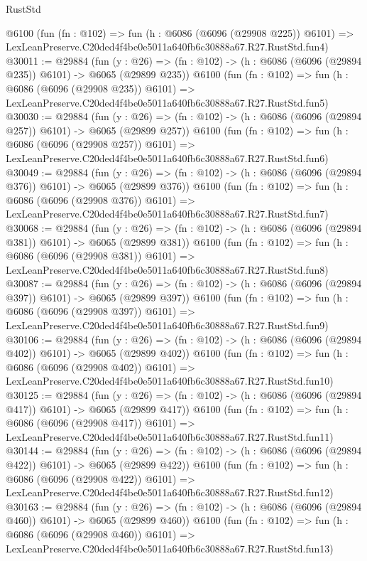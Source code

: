 \begin{lexlean}{RustStd}
\begin{coremodule}
    @6100
    (fun (fn : @102) =>
    fun (h : @6086 (@6096 (@29908 @225)) @6101) =>
    LexLeanPreserve.C20ded4f4be0e5011a640fb6c30888a67.R27.RustStd.fun4)
@30011 := @29884
    (fun (y : @26) => (fn : @102) -> (h : @6086 (@6096 (@29894 @235)) @6101) -> @6065 (@29899 @235))
    @6100
    (fun (fn : @102) =>
    fun (h : @6086 (@6096 (@29908 @235)) @6101) =>
    LexLeanPreserve.C20ded4f4be0e5011a640fb6c30888a67.R27.RustStd.fun5)
@30030 := @29884
    (fun (y : @26) => (fn : @102) -> (h : @6086 (@6096 (@29894 @257)) @6101) -> @6065 (@29899 @257))
    @6100
    (fun (fn : @102) =>
    fun (h : @6086 (@6096 (@29908 @257)) @6101) =>
    LexLeanPreserve.C20ded4f4be0e5011a640fb6c30888a67.R27.RustStd.fun6)
@30049 := @29884
    (fun (y : @26) => (fn : @102) -> (h : @6086 (@6096 (@29894 @376)) @6101) -> @6065 (@29899 @376))
    @6100
    (fun (fn : @102) =>
    fun (h : @6086 (@6096 (@29908 @376)) @6101) =>
    LexLeanPreserve.C20ded4f4be0e5011a640fb6c30888a67.R27.RustStd.fun7)
@30068 := @29884
    (fun (y : @26) => (fn : @102) -> (h : @6086 (@6096 (@29894 @381)) @6101) -> @6065 (@29899 @381))
    @6100
    (fun (fn : @102) =>
    fun (h : @6086 (@6096 (@29908 @381)) @6101) =>
    LexLeanPreserve.C20ded4f4be0e5011a640fb6c30888a67.R27.RustStd.fun8)
@30087 := @29884
    (fun (y : @26) => (fn : @102) -> (h : @6086 (@6096 (@29894 @397)) @6101) -> @6065 (@29899 @397))
    @6100
    (fun (fn : @102) =>
    fun (h : @6086 (@6096 (@29908 @397)) @6101) =>
    LexLeanPreserve.C20ded4f4be0e5011a640fb6c30888a67.R27.RustStd.fun9)
@30106 := @29884
    (fun (y : @26) => (fn : @102) -> (h : @6086 (@6096 (@29894 @402)) @6101) -> @6065 (@29899 @402))
    @6100
    (fun (fn : @102) =>
    fun (h : @6086 (@6096 (@29908 @402)) @6101) =>
    LexLeanPreserve.C20ded4f4be0e5011a640fb6c30888a67.R27.RustStd.fun10)
@30125 := @29884
    (fun (y : @26) => (fn : @102) -> (h : @6086 (@6096 (@29894 @417)) @6101) -> @6065 (@29899 @417))
    @6100
    (fun (fn : @102) =>
    fun (h : @6086 (@6096 (@29908 @417)) @6101) =>
    LexLeanPreserve.C20ded4f4be0e5011a640fb6c30888a67.R27.RustStd.fun11)
@30144 := @29884
    (fun (y : @26) => (fn : @102) -> (h : @6086 (@6096 (@29894 @422)) @6101) -> @6065 (@29899 @422))
    @6100
    (fun (fn : @102) =>
    fun (h : @6086 (@6096 (@29908 @422)) @6101) =>
    LexLeanPreserve.C20ded4f4be0e5011a640fb6c30888a67.R27.RustStd.fun12)
@30163 := @29884
    (fun (y : @26) => (fn : @102) -> (h : @6086 (@6096 (@29894 @460)) @6101) -> @6065 (@29899 @460))
    @6100
    (fun (fn : @102) =>
    fun (h : @6086 (@6096 (@29908 @460)) @6101) =>
    LexLeanPreserve.C20ded4f4be0e5011a640fb6c30888a67.R27.RustStd.fun13)

\end{coremodule}
\end{lexlean}
